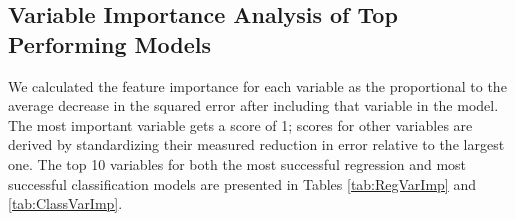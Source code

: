 \documentclass[12pt,]{article}
\begin{document}
\hypertarget{variable-importance-analysis-of-top-performing-models}{%
\subsection{Variable Importance Analysis of Top Performing
Models}\label{variable-importance-analysis-of-top-performing-models}}

We calculated the feature importance for each variable as the
proportional to the average decrease in the squared error after
including that variable in the model. The most important variable gets a
score of 1; scores for other variables are derived by standardizing
their measured reduction in error relative to the largest one. The top
10 variables for both the most successful regression and most successful
classification models are presented in Tables \ref{tab:RegVarImp} and
\ref{tab:ClassVarImp}.

\begin{table}

\caption{\label{tab:Reg VarImp}\label{tab:RegVarImp} Feature Importance of Top Performing Regression Model}
\centering
{}
\end{table}
\end{document}
